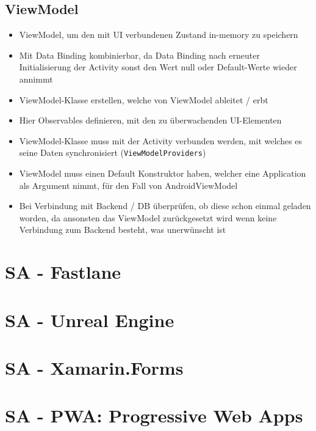 \documentclass[a4paper]{article}
\begin{document}
		\subsection{ViewModel}
		
		\begin{itemize}
			\item ViewModel, um den mit UI verbundenen Zustand in-memory zu speichern
			\item Mit Data Binding kombinierbar, da Data Binding nach erneuter Initialisierung der Activity sonst den Wert null oder Default-Werte wieder annimmt
			\item ViewModel-Klasse erstellen, welche von ViewModel ableitet / erbt
			\item Hier Observables definieren, mit den zu überwachenden UI-Elementen
			\item ViewModel-Klasse muss mit der Activity verbunden werden, mit welches es seine Daten synchronisiert (\texttt{ViewModelProviders})
			\item ViewModel muss einen Default Konstruktor haben, welcher eine Application als Argument nimmt, für den Fall von AndroidViewModel
			\item Bei Verbindung mit Backend / DB überprüfen, ob diese schon einmal geladen worden, da ansonsten das ViewModel zurückgesetzt wird wenn keine Verbindung zum Backend besteht, was unerwünscht ist
		\end{itemize}
		
	
	\section{SA - Fastlane}
	
	
	
	\section{SA - Unreal Engine}
	
	
	
	\section{SA - Xamarin.Forms}
	
	
	
	\section{SA - PWA: Progressive Web Apps}
	
\end{document}
